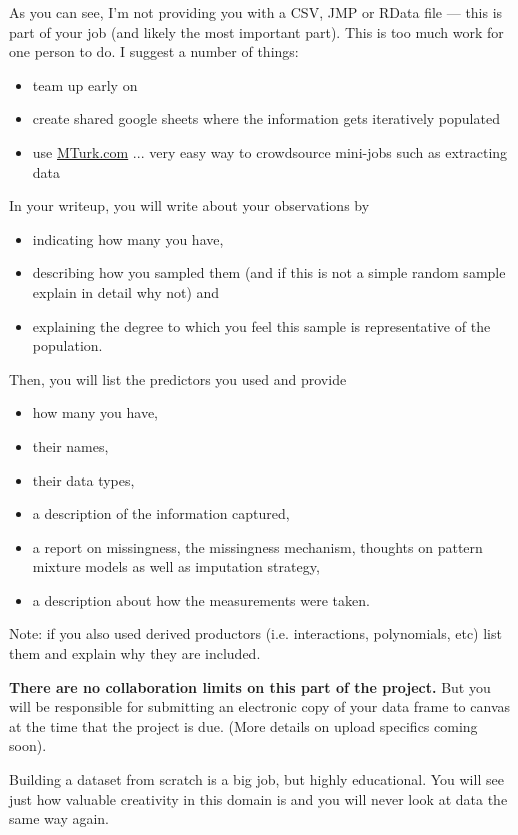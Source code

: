 \documentclass[12pt]{article}
\begin{document}
As you can see, I'm not providing you with a CSV, JMP or RData file --- this is part of your job (and likely the most important part). This is too much work for one person to do. I suggest a number of things:

\begin{itemize}
\item team up early on
\item create shared google sheets where the information gets iteratively populated
\item use \url{MTurk.com} ... very easy way to crowdsource mini-jobs such as extracting data
\end{itemize}

In your writeup, you will write about your observations by

\begin{itemize}
\item indicating how many you have,
\item describing how you sampled them (and if this is not a simple random sample explain in detail why not) and
\item explaining the degree to which you feel this sample is representative of the population.
\end{itemize}

\noindent Then, you will list the predictors you used and provide

\begin{itemize}
\item how many you have,
\item their names,
\item their data types,
\item a description of the information captured,
\item a report on missingness, the missingness mechanism, thoughts on pattern mixture models as well as imputation strategy, 
\item a description about how the measurements were taken.
\end{itemize}

Note: if you also used derived productors (i.e. interactions, polynomials, etc) list them and explain why they are included.


\textbf{There are no collaboration limits on this part of the project.} But you will be responsible for submitting an electronic copy of your data frame to canvas at the time that the project is due. (More details on upload specifics coming soon).

Building a dataset from scratch is a big job, but highly educational. You will see just how valuable creativity in this domain is and you will never look at data the same way again.
\end{document}
